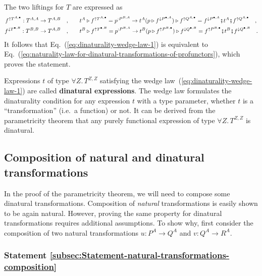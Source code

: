 The two liftings for $T$ are expressed as
\begin{align*}
f^{\uparrow T^{A,\bullet}}:T^{A,A}\rightarrow T^{A,B}\quad, & \quad\quad t^{A}\triangleright f^{\uparrow T^{A,\bullet}}=p^{:P^{B,A}}\rightarrow t^{A}(p\triangleright f^{\downarrow P^{\bullet,A}})\triangleright f^{\uparrow Q^{A,\bullet}}=f^{\downarrow P^{\bullet,A}}\bef t^{A}\bef f^{\uparrow Q^{A,\bullet}}\quad,\\
f^{\downarrow T^{\bullet,B}}:T^{B,B}\rightarrow T^{A,B}\quad, & \quad\quad t^{B}\triangleright f^{\uparrow T^{\bullet,B}}=p^{:P^{B,A}}\rightarrow t^{B}(p\triangleright f^{\uparrow P^{B,\bullet}})\triangleright f^{\downarrow Q^{\bullet,B}}=f^{\uparrow P^{B,\bullet}}\bef t^{B}\bef f^{\downarrow Q^{\bullet,B}}\quad.
\end{align*}
It follows that Eq.~(\ref{eq:dinaturality-wedge-law-1}) is equivalent
to Eq.~(\ref{eq:naturality-law-for-dinatural-transformations-of-profunctors}),
which proves the statement.

Expressions $t$ of type $\forall Z.\,T^{Z,Z}$ satisfying the wedge
law~(\ref{eq:dinaturality-wedge-law-1}) are called \textbf{dinatural
expressions}. The wedge law formulates
the dinaturality condition for any expression $t$ with a type parameter,
whether $t$ is a ``transformation'' (i.e.~a function) or not.
It can be derived from the parametricity theorem that any purely functional
expression of type $\forall Z.\,T^{Z,Z}$ is dinatural.

\subsection{Composition of natural and dinatural transformations}

In the proof of the parametricity theorem, we will need to compose
some dinatural transformations. Composition of \emph{natural} transformations
is easily shown to be again natural. However, proving the same property
for dinatural transformations requires additional assumptions. To
show why, first consider the composition of two natural transformations
$u:P^{A}\rightarrow Q^{A}$ and $v:Q^{A}\rightarrow R^{A}$.

\subsubsection{Statement \label{subsec:Statement-natural-transformations-composition}\ref{subsec:Statement-natural-transformations-composition}}

